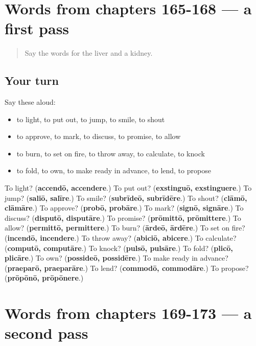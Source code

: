 \section[(dialogue)]{Words from chapters 165-168 — a first pass}

\label{lesson:LA-R173-first-pass-words-from-chapters-165-168}



\begin{quote}
Say the words for the liver and a kidney.
\end{quote}

\subsection*{Your turn}
Say these aloud:

\begin{itemize}
\raggedright
  \item to light, to put out, to jump, to smile, to shout
  \item to approve, to mark, to discuss, to promise, to allow
  \item to burn, to set on fire, to throw away, to calculate, to knock
  \item to fold, to own, to make ready in advance, to lend, to propose
\end{itemize}

\begin{tcolorbox}[breakable,colback=teal!4,colframe=teal!35!black,title={Before you move on}]
To light? (\textbf{accendō, accendere}.) To put out? (\textbf{exstinguō, exstinguere}.) To jump? (\textbf{saliō, salīre}.) To smile? (\textbf{subrīdeō, subrīdēre}.) To shout? (\textbf{clāmō, clāmāre}.) To approve? (\textbf{probō, probāre}.) To mark? (\textbf{signō, signāre}.) To discuss? (\textbf{disputō, disputāre}.) To promise? (\textbf{prōmittō, prōmittere}.) To allow? (\textbf{permittō, permittere}.) To burn? (\textbf{ārdeō, ārdēre}.) To set on fire? (\textbf{incendō, incendere}.) To throw away? (\textbf{abiciō, abicere}.) To calculate? (\textbf{computō, computāre}.) To knock? (\textbf{pulsō, pulsāre}.) To fold? (\textbf{plicō, plicāre}.) To own? (\textbf{possideō, possidēre}.) To make ready in advance? (\textbf{praeparō, praeparāre}.) To lend? (\textbf{commodō, commodāre}.) To propose? (\textbf{prōpōnō, prōpōnere}.)
\end{tcolorbox}
\section[(dialogue)]{Words from chapters 169-173 — a second pass}


